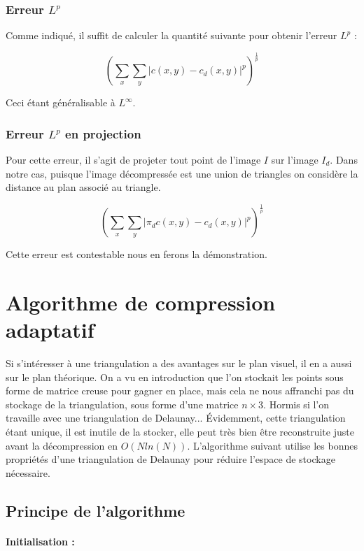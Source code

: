 \documentclass{report}
\begin{document}
\subsubsection{Erreur $L^p$}

Comme indiqué, il suffit de calculer la quantité suivante pour obtenir l'erreur $L^p$ :

$$ (\sum_x \sum_y \vert c(x,y) - c_d(x, y) \vert^p )^{\frac{1}{p}} $$

Ceci étant généralisable à $L^\infty$.

\subsubsection{Erreur $L^p$ en projection}

Pour cette erreur, il s'agit de projeter tout point de l'image $I$ sur l'image $I_d$. Dans notre cas, puisque l'image décompressée est une union de triangles on considère la distance au plan associé au triangle.

$$ (\sum_x \sum_y \vert \pi_d c(x,y) - c_d(x, y) \vert^p )^{\frac{1}{p}} $$

Cette erreur est contestable nous en ferons la démonstration.

\section{Algorithme de compression adaptatif}

Si s'intéresser à une triangulation a des avantages sur le plan visuel, il en a aussi sur le plan théorique. On a vu en introduction que l'on stockait les points sous forme de matrice creuse pour gagner en place, mais cela ne nous affranchi pas du stockage de la triangulation, sous forme d'une matrice $n \times 3$. Hormis si l'on travaille avec une triangulation de Delaunay... Évidemment, cette triangulation étant unique, il est inutile de la stocker, elle peut très bien être reconstruite juste avant la décompression en $O(N ln(N))$. L'algorithme suivant utilise les bonnes propriétés d'une triangulation de Delaunay pour réduire l'espace de stockage nécessaire.

\subsection{Principe de l'algorithme}

\paragraph{Initialisation :}
\end{document}
